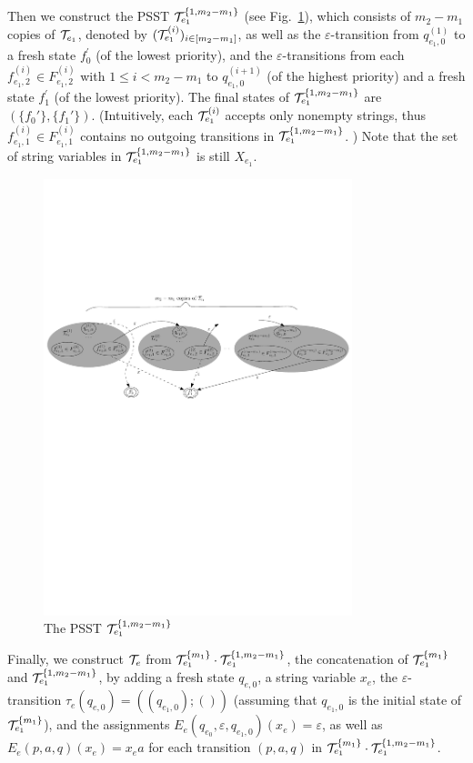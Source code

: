 Then we construct the PSST $\mathcal{T}^{\{1,m_2-m_1\}}_{e_1}$ (see Fig.~\ref{fig-reg2pfa-4}), which consists of $m_2-m_1$ copies of $\mathcal{T}_{e_1}$, denoted by $(\mathcal{T}^{(i)}_{e_1})_{i \in [m_2-m_1]}$, as well as the $\varepsilon$-transition from $q^{(1)}_{e_1,0}$ to a fresh state $f^\prime_0$ (of the lowest priority), and the $\varepsilon$-transitions from each $f^{(i)}_{e_1,2} \in F^{(i)}_{e_1,2}$ with $1\le i < m_2-m_1$ to $q^{(i+1)}_{e_1,0}$ (of the highest priority) and a fresh state $f^\prime_1$ (of the lowest priority). The final states of $\mathcal{T}^{\{1,m_2-m_1\}}_{e_1}$ are $(\{f_0'\},\{f_1'\})$. (Intuitively, each $\mathcal{T}^{(i)}_{e_1}$ accepts only nonempty strings, thus $f^{(i)}_{e_1,1} \in F^{(i)}_{e_1,1}$ contains no outgoing transitions in $\mathcal{T}^{\{1,m_2-m_1\}}_{e_1}$. ) Note that the set of string variables in $\mathcal{T}^{\{1,m_2-m_1\}}_{e_1}$ is still $X_{e_1}$.
%
\begin{figure}[ht]
	\centering
	\includegraphics[width = 0.8\textwidth]{reg2pfa-4.pdf}
	\caption{The PSST $\mathcal{T}^{\{1,m_2-m_1\}}_{e_1}$}
	\label{fig-reg2pfa-4}
\end{figure}  

Finally, we construct $\mathcal{T}_e$ from $\mathcal{T}^{\{m_1\}}_{e_1} \cdot \mathcal{T}^{\{1,m_2-m_1\}}_{e_1}$, the concatenation of $\mathcal{T}^{\{m_1\}}_{e_1}$ and $\mathcal{T}^{\{1,m_2-m_1\}}_{e_1}$, by adding a fresh state $q_{e,0}$, a string variable $x_e$, the $\varepsilon$-transition $\tau_e(q_{e,0}) = ((q_{e_1,0});())$ (assuming that $q_{e_1,0}$ is the initial state of $\mathcal{T}^{\{m_1\}}_{e_1}$),  and the assignments $E_e(q_{e_0}, \varepsilon, q_{e_1,0})(x_e) = \varepsilon$, as well as $E_e(p, a, q)(x_e) = x_e a$ for each transition $(p, a, q)$ in  $\mathcal{T}^{\{m_1\}}_{e_1} \cdot \mathcal{T}^{\{1,m_2-m_1\}}_{e_1}$.

